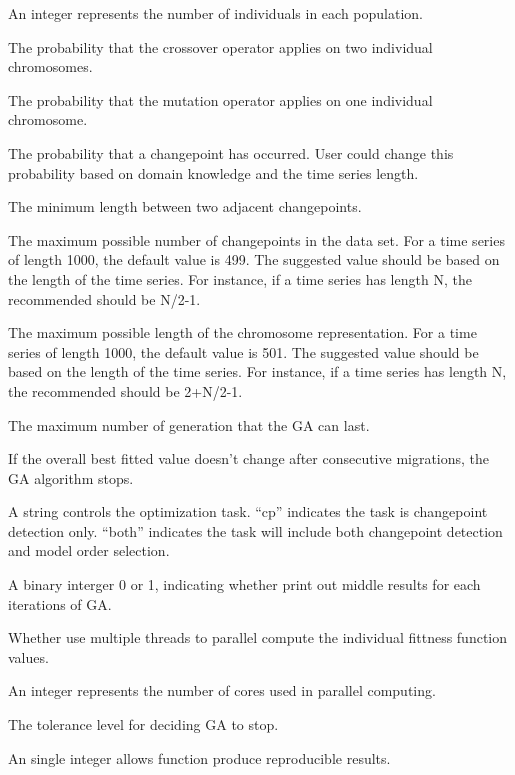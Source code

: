 \documentclass[a4paper]{book}
\begin{document}
\begin{Arguments}
\begin{ldescription}
\item[\code{popsize}] An integer represents the number of individuals in each population.
\item[\code{Pcrossover}] The probability that the crossover operator applies on two individual chromosomes.
\item[\code{Pmutation}] The probability that the mutation operator applies on one individual chromosome.
\item[\code{Pchangepoint}] The probability that a changepoint has occurred. User
could change this probability based on domain knowledge and the time series
length.
\item[\code{minDist}] The minimum length between two adjacent changepoints.
\item[\code{mmax}] The maximum possible number of changepoints in the data set.
For a time series of length 1000, the default value is 499. The suggested
value should be based on the length of the time series. For instance, if a
time series has length N, the recommended  should be N/2-1.
\item[\code{lmax}] The maximum possible length of the chromosome representation. For
a time series of length 1000, the default value is 501. The suggested value
should be based on the length of the time series. For instance, if a time
series has length N, the recommended  should be 2+N/2-1.
\item[\code{maxgen}] The maximum number of generation that the GA can last.
\item[\code{maxconv}] If the overall best fitted value doesn't change after  consecutive migrations, the GA algorithm stops.
\item[\code{option}] A string controls the optimization task. ``cp'' indicates the task is changepoint detection only. ``both'' indicates the task will include both changepoint detection and model order selection.
\item[\code{monitoring}] A binary interger 0 or 1, indicating whether print out middle results for each iterations of GA.
\item[\code{parallel}] Whether use multiple threads to parallel compute the individual fittness function values.
\item[\code{nCore}] An integer represents the number of cores used in parallel computing.
\item[\code{tol}] The tolerance level for deciding GA to stop.
\item[\code{seed}] An single integer allows function produce reproducible results.
\end{ldescription}
\end{Arguments}
\end{document}
